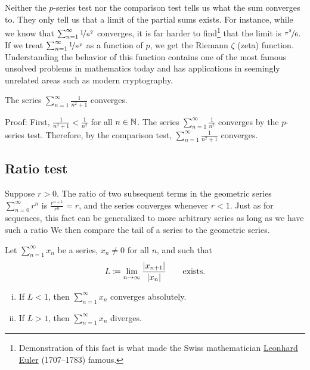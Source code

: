 Neither the $p$-series test nor the comparison test 
tells us what the sum converges to.  They only tell us that a limit
of the partial sums exists.  For instance, while we know that
$\sum_{n=1}^\infty \nicefrac{1}{n^2}$ converges, it is far harder to
find\footnote{Demonstration of this fact is
what made the Swiss mathematician
\href{https://en.wikipedia.org/wiki/Leonhard_Euler}{Leonhard Euler}
(1707--1783)
famous.}
that the limit is $\nicefrac{\pi^2}{6}$.
If we treat $\sum_{n=1}^\infty \nicefrac{1}{n^p}$ as a function of $p$,
we get the Riemann $\zeta$ (zeta) function.  Understanding the
behavior of this function contains
one of the most famous unsolved problems in mathematics today and has applications
in seemingly unrelated areas such as modern cryptography.

\begin{example}
The series $\sum_{n=1}^\infty \frac{1}{n^2+1}$ converges.

Proof:  First, $\frac{1}{n^2+1} < \frac{1}{n^2}$ for all $n \in {\mathbb{N}}$.
The series $\sum_{n=1}^\infty \frac{1}{n^2}$ converges by the $p$-series test.
Therefore, by the comparison test, $\sum_{n=1}^\infty \frac{1}{n^2+1}$ converges.
\end{example}

\subsection{Ratio test}

Suppose $r > 0$.  The ratio of two subsequent terms in the geometric series
$\sum_{n=0}^\infty r^n$ is $\frac{r^{n+1}}{r^n} = r$, and the series converges
whenever $r < 1$.  Just as for sequences, this fact
can be generalized to more arbitrary series
as long as we have such a ratio   We then compare
the tail of a series to the geometric series.


\begin{prop}
Let $\sum_{n=1}^\infty x_n$ be a series, $x_n \neq 0$ for all $n$, and such that
\begin{equation*}
L \coloneqq \lim_{n\to\infty} \frac{\lvert {x_{n+1}} \rvert}{\lvert {x_n} \rvert}
\qquad \text{exists.}
\end{equation*}
\begin{enumerate}[(i)]
\item
If $L < 1$, then $\sum_{n=1}^\infty x_n$ converges absolutely.
\item
If $L > 1$, then $\sum_{n=1}^\infty x_n$ diverges.
\end{enumerate}
\end{prop}

